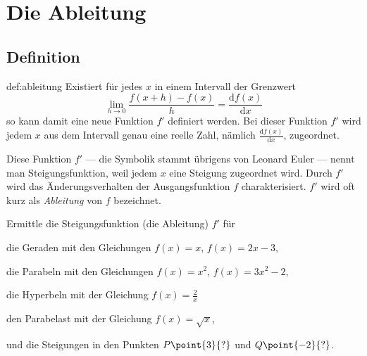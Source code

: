 \documentclass[%
11pt,%
twoside,%
titlepage,%
german,%
headsepline%
]{scrartcl}
\begin{document}
\section{Die Ableitung}
\subsection{Definition}

\begin{cdef}[Ableitung]{def:ableitung}
Existiert f\"ur jedes $x$ in einem Intervall der Grenzwert
$$\lim_{h\to0}\frac{f(x+h)-f(x)}{h}=\frac{\mathrm{d}f(x)}{\mathrm{d}x}$$
so kann damit eine neue Funktion $f'$ definiert werden. Bei dieser Funktion $f'$ wird jedem $x$ aus dem Intervall genau eine reelle Zahl, n\"amlich $\frac{\mathrm{d}f(x)}{\mathrm{d}x}$, zugeordnet.

Diese Funktion $f'$ --- die Symbolik stammt \"ubrigens von Leonard Euler --- nennt man Steigungsfunktion, weil jedem $x$ eine Steigung zugeordnet wird. Durch $f'$ wird das \"Anderungsverhalten der Ausgangsfunktion $f$ charakterisiert. $f'$ wird oft kurz als \emph{Ableitung} von $f$ bezeichnet.
\end{cdef}

\begin{ueb}[Steigungsfunktion]\label{uebsteigungsfunktion}
Ermittle
die Steigungsfunktion (die Ableitung) $f'$ f\"ur
\begin{enumeratea}
\item die Geraden mit den Gleichungen $f(x)=x$, $f(x)=2x-3$,
\item die Parabeln mit den Gleichungen $f(x)=x^2$, $f(x)=3x^2-2$,
\item die Hyperbeln mit der Gleichung $f(x)=\frac{2}{x}$
\item den Parabelast mit der Gleichung $f(x)=\sqrt{x}$,
\end{enumeratea}
und die Steigungen in den Punkten $P\point{3}{?}$ und $Q\point{-2}{?}$.
\end{ueb}
\end{document}
